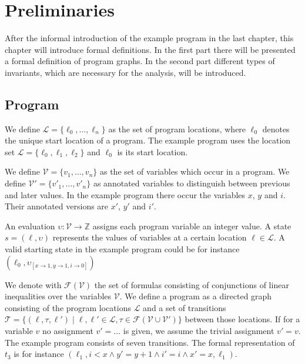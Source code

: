 \section{Preliminaries}
\label{sec:preliminaries}

After the informal introduction of the example program in the last chapter, this chapter will introduce formal definitions.
In the first part there will be presented a formal definition of program graphs.
In the second part different types of invariants, which are necessary for the analysis, will be introduced.

\subsection{Program}

We define $\mathcal{L} = \lbrace \ell_0, \dots, \ell_n \rbrace$ as the set of program locations, where $\ell_0$ denotes the unique start location of a program.
The example program uses the location set $\mathcal{L} = \lbrace \ell_0 , \ell_1 , \ell_2 \rbrace$ and $\ell_0$ is its start location.

We define $\mathcal{V} = \lbrace v_1, \dots, v_n \rbrace$ as the set of variables which occur in a program.
We define $\mathcal{V}' = \lbrace v'_1, \dots, v'_n \rbrace$ as annotated variables to distinguish between previous and later values.
In the example program there occur the variables $x$, $y$ and $i$.
Their annotated versions are $x'$, $y'$ and $i'$.

An evaluation $\upsilon: \mathcal{V} \rightarrow \mathbb{Z}$ assigns each program variable an integer value.
A state $s = (\ell, \upsilon)$ represents the values of variables at a certain location $\ell \in \mathcal{L}$.
A valid starting state in the example program could be for instance $(\ell_0, \upsilon_{[x \rightarrow 1, y \rightarrow 1, i \rightarrow 0]})$

We denote with $\mathcal{F}(\mathcal{V})$ the set of formulas consisting of conjunctions of linear inequalities over the variables $\mathcal{V}$.
We define a program as a directed graph consisting of the program locations $\mathcal{L}$ and a set of transitions $\mathcal{T} = \lbrace (\ell, \tau, \ell') \mid \ell, \ell' \in \mathcal{L}, \tau \in \mathcal{F}(\mathcal{V} \cup \mathcal{V}') \rbrace$ between those locations.
If for a variable $v$ no assignment $v' = \dots$ is given, we assume the trivial assignment $v' = v$.
The example program consists of seven transitions. The formal representation of $t_3$ is for instance $(\ell_1,i<x \wedge y'=y+1 \wedge i'=i \wedge x'=x,\ell_1)$.

